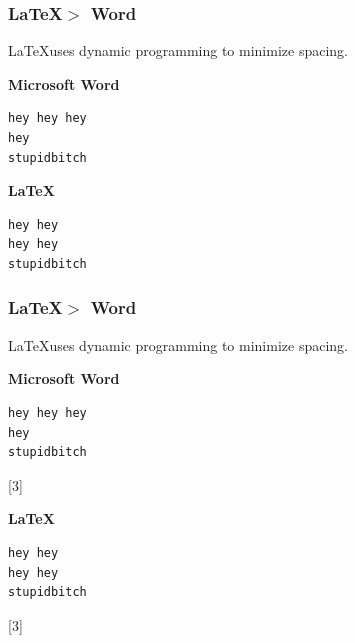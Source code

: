 \documentclass{beamer}
\renewcommand{\;}{\hspace{0.25em}}
\begin{document}
\begin{frame}[fragile]
\frametitle{\LaTeX $>$ Word}
\LaTeX\;uses dynamic programming to minimize spacing.

\begin{multicols}{2}
\textbf{Microsoft Word}
\begin{verbatim}
hey hey hey
hey
stupidbitch
\end{verbatim}
\columnbreak

\textbf{\LaTeX}
\begin{verbatim}
hey hey
hey hey
stupidbitch
\end{verbatim}
\end{multicols}

\end{frame}

\begin{frame}[fragile]
\frametitle{\LaTeX $>$ Word}
\LaTeX\;uses dynamic programming to minimize spacing.

\begin{multicols}{2}
\textbf{Microsoft Word}
\begin{verbatim}
hey hey hey
hey
stupidbitch
\end{verbatim}
{\phantom{w}\quad{}[3]}
\columnbreak

\textbf{\LaTeX}
\begin{verbatim}
hey hey
hey hey
stupidbitch
\end{verbatim}
{\phantom{w}[3]}
\end{multicols}

\end{frame}
\end{document}
